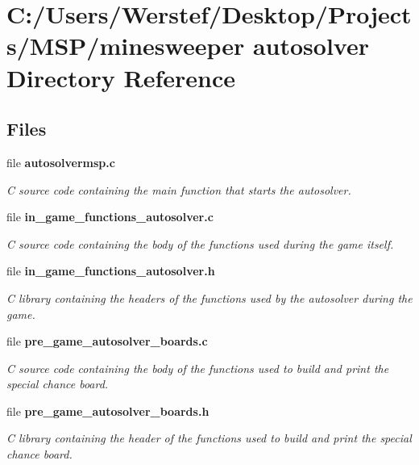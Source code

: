 \section{C\+:/\+Users/\+Werstef/\+Desktop/\+Projects/\+M\+S\+P/minesweeper autosolver Directory Reference}
\label{dir_c2d5bcbd5f708b3a436b77c93bc6ca39}
\subsection*{Files}
\begin{DoxyCompactItemize}
\item 
file \textbf{ autosolvermsp.\+c}
\begin{DoxyCompactList}\small\item\em C source code containing the main function that starts the autosolver. \end{DoxyCompactList}\item 
file \textbf{ in\+\_\+game\+\_\+functions\+\_\+autosolver.\+c}
\begin{DoxyCompactList}\small\item\em C source code containing the body of the functions used during the game itself. \end{DoxyCompactList}\item 
file \textbf{ in\+\_\+game\+\_\+functions\+\_\+autosolver.\+h}
\begin{DoxyCompactList}\small\item\em C library containing the headers of the functions used by the autosolver during the game. \end{DoxyCompactList}\item 
file \textbf{ pre\+\_\+game\+\_\+autosolver\+\_\+boards.\+c}
\begin{DoxyCompactList}\small\item\em C source code containing the body of the functions used to build and print the special chance board. \end{DoxyCompactList}\item 
file \textbf{ pre\+\_\+game\+\_\+autosolver\+\_\+boards.\+h}
\begin{DoxyCompactList}\small\item\em C library containing the header of the functions used to build and print the special chance board. \end{DoxyCompactList}\item 

\end{DoxyCompactItemize}
